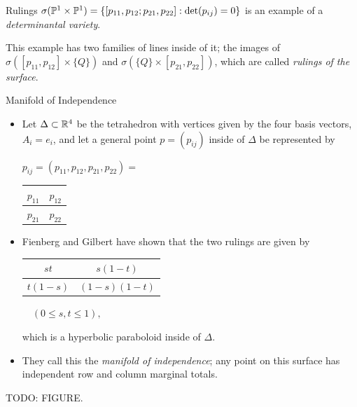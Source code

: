 \begin{frame}
    \begin{block}{Rulings}
    $\sigma(\mathbb{P}^{1} \times \mathbb{P}^{1}) = \{ [p_{11}, p_{12}; p_{21}, p_{22}] : \det (p_{ij}) = 0 \} $ is an example of a \emph{determinantal variety}.
    
    This example has two families of lines inside of it; the images of $\sigma( [p_{11}, p_{12}] \times \{ Q \} )$ and $\sigma( \{ Q \} \times [p_{21}, p_{22}])$, which are called \emph{rulings of the surface}.
    \end{block}

\end{frame}

\begin{frame}{Manifold of Independence}

    \begin{itemize}
        \item Let $\Delta \subset \mathbb{R}^{4}$ be the tetrahedron with vertices given by the four basis vectors, $A_{i} = e_{i}$, and let a general point $p = (p_{ij})$ inside of $\Delta$ be represented by
            \begin{center}
        \begin{table}[]
        $p_{ij} = (p_{11}, p_{12}, p_{21}, p_{22}) =$ 
        \begin{tabular}{|l|l|}
        \hline
        $p_{11}$ & $p_{12}$ \\ \hline
        $p_{21}$ & $p_{22}$ \\ \hline
        \end{tabular}
        \end{table}
        \end{center}

        \item Fienberg and Gilbert have shown that the two rulings are given by
    \begin{center}
    \begin{table}[]
    \begin{tabular}{|c|c|}
    \hline
    $st$ & $s(1-t)$ \\ \hline
    $t(1-s)$ & $(1-s)(1-t)$ \\ \hline
    \end{tabular}
    $\quad (0 \leq s,t \leq 1),$
    \end{table}
    \end{center}
    
    which is a hyperbolic paraboloid inside of $\Delta$.
    
    \item They call this the \emph{manifold of independence}; any point on this surface has independent row and column marginal totals.

    \end{itemize}
    
\end{frame}

\begin{frame}
    TODO: FIGURE.
\end{frame}